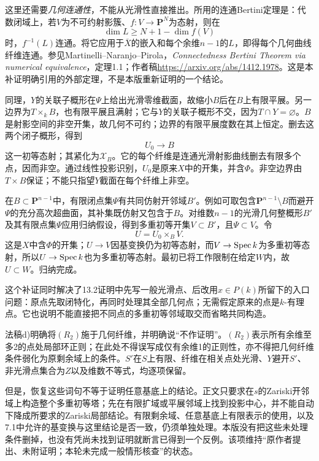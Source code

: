\begin{analysisproof}
这里还需要\emph{几何连通性}，不能从光滑性直接推出。所用的连通Bertini定理是：代数闭域上，若$V$为不可约射影簇、$f\colon V\to\mathbf P^N$为态射，则在
\[
\dim L\geq N+1-\dim f(V)
\]
时，$f^{-1}(L)$连通。将它应用于$\overline X$的嵌入和每个余维$n-1$的$L$，即得每个几何曲线纤维连通。参见Martinelli--Naranjo--Pirola，\emph{Connectedness Bertini Theorem via numerical equivalence}，定理1.1；作者稿\url{https://arxiv.org/abs/1412.1978}。这是本补证明确引用的外部定理，不是本版重新证明的一个结论。

同理，$Y$的关联子概形在$\Psi$上给出光滑零维截面，故缩小$B$后在$B$上有限平展。另一边界为$T\times_k B$，也有限平展且满射；它与$Y$的关联子概形不交，因为$T\cap Y=\varnothing$。$B$是射影空间的非空开集，故几何不可约；边界的有限平展度数在其上恒定。删去这两个闭子概形，得到
\[
U_0\longrightarrow B
\]
这一初等态射；其紧化为$\mathcal X_B$。它的每个纤维是连通光滑射影曲线删去有限多个点，因而非空。通过线性投影识别，$U_0$是原来$X$中的开集，并含$\Phi$。非空边界由$T\times B$保证；不能只指望$Y$截面在每个纤维上非空。

在$B\subset\mathbf P^{n-1}$中，有限闭点集$\Psi$有共同仿射开邻域$B'$。例如可取包含$\mathbf P^{n-1}\setminus B$而避开$\Psi$的充分高次超曲面，其补集既仿射又包含于$B$。对维数$n-1$的光滑几何整概形$B'$及其有限点集$\Psi$应用归纳假设，得到多重初等开集$V\subset B'$，且$\Psi\subset V$。令
\[
U=U_0\times_B V.
\]
这是$X$中含$\Phi$的开集；$U\to V$因基变换仍为初等态射，而$V\to\operatorname{Spec} k$为多重初等态射，所以$U\to\operatorname{Spec} k$也为多重初等态射。最初已将工作限制在给定$W$内，故$U\subset W$。归纳完成。
\end{analysisproof}

这个补证同时解决了13.2证明中先写一般光滑点、后改用$x\in P(k)$所留下的入口问题：原点先取闭特化，再同时处理其全部几何点；无需假定原来的点是$k$-有理点。它也说明不能直接把不同点的多重初等邻域取交而省略共同构造。

法稿d)明确将$(R_2)$施于几何纤维，并明确说“不作证明”。$(R_2)$表示所有余维至多2的点处局部环正则；在此处不得误写成仅有余维1的正则性，亦不得把几何纤维条件弱化为原剩余域上的条件。$S'$在$S$上有限、纤维在相关点处光滑、$Y$避开$S'$、非光滑点集合为$Z$以及维数不等式，均逐项保留。

但是，恢复这些词句不等于证明任意基底上的结论。正文只要求在$s$的Zariski开邻域上构造整个多重初等塔；先在有限扩域或平展邻域上找到投影中心，并不能自动下降成所要求的Zariski局部结论。有限剩余域、任意基底上有限表示的使用，以及7.1中允许的基变换与这里结论是否一致，仍须单独处理。本版没有把这些未处理条件删掉，也没有凭尚未找到证明就断言已得到一个反例。该项维持“原作者提出、未附证明；本轮未完成一般情形核查”的状态。


